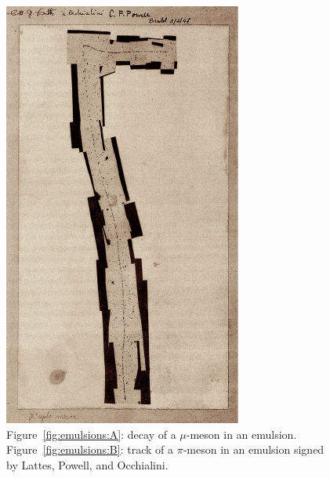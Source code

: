\begin{figure}
\begin{minipage}{\linewidth}
			\includegraphics[width=.8\linewidth]{fig/chapt2/pion-emulsion.pdf}
			\subcaption{\label{fig:emulsions:B}}
		\end{minipage}
		\caption{\label{fig:emulsions} Figure~\ref{fig:emulsions:A}: decay of a $\mu$-meson in an emulsion. Figure~\ref{fig:emulsions:B}: track of a $\pi$-meson in an emulsion signed by Lattes, Powell, and Occhialini.}
		\vspace{-5pt}
	\end{figure}
	
